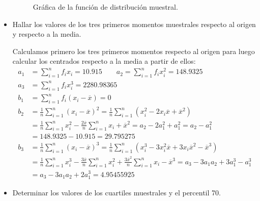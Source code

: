 \begin{ejercicio}
\begin{itemize}
            \begin{figure}[H]
                \centering
                \caption{Gráfica de la función de distribución muestral.}
            \end{figure}
        \item Hallar los valores de los tres primeros momentos muestrales respecto al origen y respecto a la media.

            Calculamos primero los tres primeros momentos respecto al origen para luego calcular los centrados respecto a la media a partir de ellos:
            \begin{align*}
                a_1 &= \sum_{i=1}^{n} f_i x_i = 10.915 \qquad 
                a_2 = \sum_{i=1}^{n} f_i x_i^2 = 148.9325 \\
                a_3 &= \sum_{i=1}^{n} f_i x_i^3 = 2280.98365 \\
                b_1 &= \sum_{i=1}^{n} f_i {(x_i - \overline{x})}= 0\qquad  \\
                b_2 &= \frac{1}{n}\sum_{i=1}^{n}{(x_i-\overline{x})}^{2} = \frac{1}{n}\sum_{i=1}^{n}(x_i^2 - 2x_i \overline{x}+\overline{x}^2)  \\ &= \frac{1}{n}\sum_{i=1}^{n}x_i^2 - \frac{2\overline{x}}{n}\sum_{i=1}^{n}x_i + \overline{x}^2 = a_2 -2a_1^2 + a_1^2 = a_2 - a_1^2 \\
                    &= 148.9325 - 10.915  = 29.795275\\
                b_3 &= \frac{1}{n}\sum_{i=1}^{n} {(x_i-\overline{x})}^{3} = \frac{1}{n}\sum_{i=1}^{n}\left(x_i^3 - 3x_i^2 \overline{x} + 3x_i\overline{x}^2 -\overline{x}^3\right) \\
                    &= \frac{1}{n}\sum_{i=1}^{n}x_i^3 - \frac{3\overline{x}}{n}\sum_{i=1}^{n}x_i^2 + \frac{3\overline{x}^2}{n}\sum_{i=1}^{n}x_i - \overline{x}^3 = a_3 - 3a_1a_2 + 3a_1^3 - a_1^3 \\
                    &= a_3 - 3a_1a_2 + 2a_1^3 = 4.95455925
            \end{align*}
        \item Determinar los valores de los cuartiles muestrales y el percentil 70.


\end{itemize}
\end{ejercicio}

